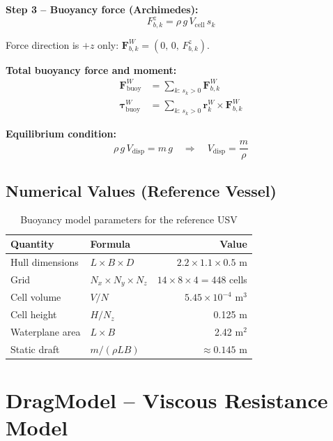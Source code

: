 \documentclass[12pt,a4paper]{article}
\newcommand{\Fvec}{\mathbf{F}}
\begin{document}
\textbf{Step 3 -- Buoyancy force (Archimedes):}
\begin{equation}
  \boxed{F_{b,k}^z = \rho\, g\, V_{\text{cell}}\, s_k}
  \label{eq:buoyancy}
\end{equation}

Force direction is $+z$ only: $\mathbf{F}_{b,k}^W = (0,\,0,\,F_{b,k}^z)$.

\textbf{Total buoyancy force and moment:}
\begin{align}
  \Fvec_{\text{buoy}}^W &= \sum_{k:\,s_k>0} \mathbf{F}_{b,k}^W
  \label{eq:total_buoy} \\[4pt]
  \boldsymbol{\tau}_{\text{buoy}}^W &= \sum_{k:\,s_k>0} \mathbf{r}_k^W \times \mathbf{F}_{b,k}^W
  \label{eq:total_buoy_moment}
\end{align}

\textbf{Equilibrium condition:}
\begin{equation}
  \rho\,g\,V_{\text{disp}} = m\,g
  \quad\Rightarrow\quad
  V_{\text{disp}} = \frac{m}{\rho}
  \label{eq:equilibrium}
\end{equation}

\subsection{Numerical Values (Reference Vessel)}

\begin{table}[H]
  \centering
  \caption{Buoyancy model parameters for the reference USV}
  \begin{tabular}{llr}
    \toprule
    \textbf{Quantity} & \textbf{Formula} & \textbf{Value} \\
    \midrule
    Hull dimensions & $L \times B \times D$ & $2.2\times 1.1\times 0.5$ m \\
    Grid & $N_x\times N_y\times N_z$ & $14\times 8\times 4 = 448$ cells \\
    Cell volume & $V/N$ & $5.45\times10^{-4}$ m$^3$ \\
    Cell height & $H/N_z$ & 0.125 m \\
    Waterplane area & $L\times B$ & 2.42 m$^2$ \\
    Static draft & $m/(\rho L B)$ & $\approx 0.145$ m \\
    \bottomrule
  \end{tabular}
\end{table}

\section{DragModel -- Viscous Resistance Model}
\end{document}
